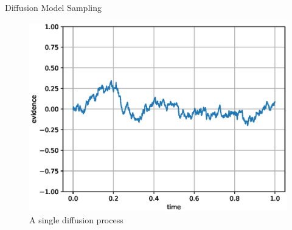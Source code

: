 \documentclass{beamer}
\begin{document}
\begin{frame}[fragile]{Diffusion Model Sampling}
\begin{figure}[htp]
\centering
\includegraphics[scale=0.55]{pydiff.eps}
\caption{A single diffusion process}
\label{}
\end{figure}
\end{frame}
\end{document}
